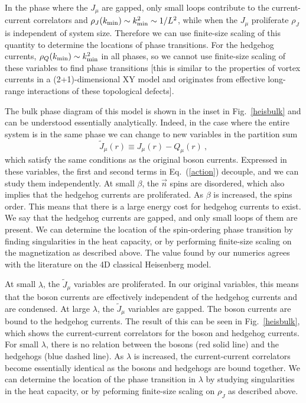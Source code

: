 \documentclass[prb,twocolumn]{revtex4-1}
\begin{document}
In the phase where the $J_\mu$ are gapped, only small loops contribute to the current-current correlators and $\rho_J(k_{\rm min})\sim {k}_{\rm min}^2 \sim 1/L^2$, while when the $J_\mu$ proliferate $\rho_J$ is independent of system size. Therefore we can use finite-size scaling of this quantity to determine the locations of phase transitions. For the hedgehog currents, $\rho_Q(k_{\rm min})\sim {k}_{\rm min}^2$ in all phases, so we cannot use finite-size scaling of these variables to find phase transitions [this is similar to the properties of vortex currents in a (2+1)-dimensional XY model and originates from effective long-range interactions of these topological defects]. 

The bulk phase diagram of this model is shown in the inset in Fig.~\ref{heisbulk} and can be understood essentially analytically.  Indeed, in the case where the entire system is in the same phase we can change to new variables in the partition sum
\begin{equation}
\tilde J_\mu(r) \equiv J_\mu(r) - Q_\mu(r) ~,
\label{shift}
\end{equation}
which satisfy the same conditions as the original boson currents.  Expressed in these variables, the first and second terms in Eq.~(\ref{action}) decouple, and we can study them independently. 
At small $\beta$, the $\vec{n}$ spins are disordered, which also implies that the hedgehog currents are proliferated. As $\beta$ is increased, the spins order. This means that there is a large energy cost for hedgehog currents to exist. We say that the hedgehog currents are gapped, and only small loops of them are present. We can determine the location of the spin-ordering phase transition by finding singularities in the heat capacity, or by performing finite-size scaling on the magnetization as described above. The value found by our numerics agrees with the literature on the 4D classical Heisenberg model.\cite{McKenzie2} %

At small $\lambda$, the $\tilde J_\mu$ variables are proliferated. In our original variables, this means that the boson currents are effectively independent of the hedgehog currents and are condensed. At large $\lambda$, the $\tilde J_\mu$ variables are gapped. The boson currents are bound to the hedgehog currents. The result of this can be seen in Fig.~\ref{heisbulk}, which shows the current-current correlators for the boson and hedgehog currents. For small $\lambda$, there is no relation between the bosons (red solid line) and the hedgehogs (blue dashed line). As $\lambda$ is increased, the current-current correlators become essentially identical as the bosons and hedgehogs are bound together. We can determine the location of the phase transition in $\lambda$ by studying singularities in the heat capacity, or by peforming finite-size scaling on $\rho_{\tilde J}$ as described above. 
\end{document}
